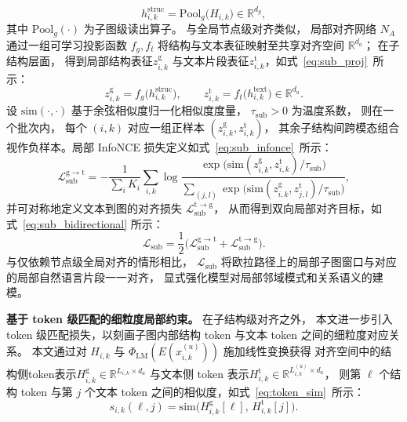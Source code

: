 \begin{equation}
  h^{\mathrm{struc}}_{i,k}
  = \mathrm{Pool}_g\!\bigl(H_{i,k}\bigr)
  \in \mathbb{R}^{d_g},
  \label{eq:sub_graph_embed}
\end{equation}
其中 \(\mathrm{Pool}_g(\cdot)\) 为子图级读出算子。
与全局节点级对齐类似，
局部对齐网络 \(N_A\) 通过一组可学习投影函数
\(f_g, f_t\) 将结构与文本表征映射至共享对齐空间
\(\mathbb{R}^{d_a}\)；
在子结构层面，
得到局部结构表征\(z^{\mathrm{g}}_{i,k}\)
与文本片段表征\(z^{\mathrm{t}}_{i,k}\)，如式~\ref{eq:sub_proj}\ 所示：
\begin{equation}
  z^{\mathrm{g}}_{i,k} = f_g\bigl(h^{\mathrm{struc}}_{i,k}\bigr),
  \qquad
  z^{\mathrm{t}}_{i,k} = f_t\bigl(h^{\mathrm{text}}_{i,k}\bigr)
  \in \mathbb{R}^{d_a}.
  \label{eq:sub_proj}
\end{equation}
设 \(\mathrm{sim}(\cdot,\cdot)\) 基于余弦相似度归一化相似度度量，
\(\tau_{\mathrm{sub}}>0\) 为温度系数，
则在一个批次内，
每个 \((i,k)\) 对应一组正样本 \((z^{\mathrm{g}}_{i,k},z^{\mathrm{t}}_{i,k})\)，
其余子结构间跨模态组合视作负样本。局部 InfoNCE 损失定义如式~\ref{eq:sub_infonce}\ 所示：
\begin{equation}
  \mathcal{L}_{\mathrm{sub}}^{\mathrm{g\rightarrow t}}
  = - \frac{1}{\sum_i K_i}
    \sum_{i,k}
    \log
    \frac{
      \exp\bigl(\mathrm{sim}(z^{\mathrm{g}}_{i,k}, z^{\mathrm{t}}_{i,k}) / \tau_{\mathrm{sub}}\bigr)
    }{
      \sum\limits_{(j,l)} \exp\bigl(\mathrm{sim}(z^{\mathrm{g}}_{i,k}, z^{\mathrm{t}}_{j,l}) / \tau_{\mathrm{sub}}\bigr)
    },
  \label{eq:sub_infonce}
\end{equation}
并可对称地定义文本到图的对齐损失
\(\mathcal{L}_{\mathrm{sub}}^{\mathrm{t\rightarrow g}}\)，
从而得到双向局部对齐目标，如式~\ref{eq:sub_bidirectional} 所示：
\begin{equation}
  \mathcal{L}_{\mathrm{sub}}
  = \frac{1}{2}
    \bigl(
      \mathcal{L}_{\mathrm{sub}}^{\mathrm{g\rightarrow t}}
      + \mathcal{L}_{\mathrm{sub}}^{\mathrm{t\rightarrow g}}
    \bigr).
  \label{eq:sub_bidirectional}
\end{equation}
与仅依赖节点级全局对齐的情形相比，
\(\mathcal{L}_{\mathrm{sub}}\) 将欧拉路径上的局部子图窗口与对应的局部自然语言片段一一对齐，
显式强化模型对局部邻域模式和关系语义的建模。

\textbf{基于 token 级匹配的细粒度局部约束。}
在子结构级对齐之外，
本文进一步引入 token 级匹配损失，以刻画子图内部结构 token 与文本 token 之间的细粒度对应关系。
本文通过对 \(H_{i,k}\) 与 \(\Phi_{\mathrm{LM}}(E(x^{(u)}_{i,k}))\) 施加线性变换获得
对齐空间中的结构侧token表示\(H^{\mathrm{g}}_{i,k} \in \mathbb{R}^{L_{i,k}\times d_a}\)
与文本侧 token 表示\(H^{\mathrm{t}}_{i,k} \in \mathbb{R}^{L^{(u)}_{i,k}\times d_a}\)，
则第 \(\ell\) 个结构 token 与第 \(j\) 个文本 token 之间的相似度，如式~\ref{eq:token_sim}\ 所示：
\begin{equation}
  s_{i,k}(\ell,j)
  = \mathrm{sim}\!\bigl(H^{\mathrm{g}}_{i,k}[\ell],\, H^{\mathrm{t}}_{i,k}[j]\bigr).
  \label{eq:token_sim}
\end{equation}


